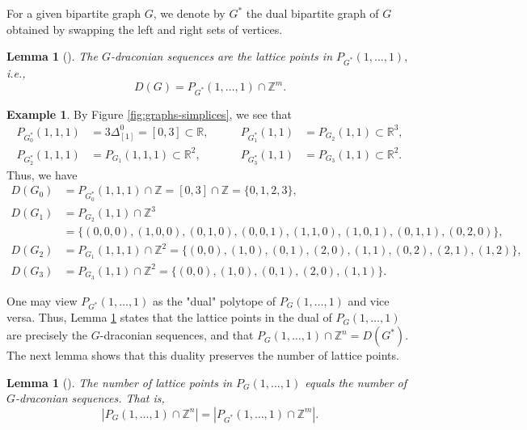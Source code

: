 \documentclass[11pt,a4paper]{article}
\newcommand{\R}{\mathbb{R}}
\newcommand{\Z}{\mathbb{Z}}
\newcommand{\1}{\mathbf{1}}
\theoremstyle{plain}
\newtheorem{lemma}[theorem]{Lemma}
\theoremstyle{definition}
\newtheorem{example}[theorem]{Example}
\begin{document}
For a given bipartite graph $G$, we denote by $G^*$ the dual bipartite graph of $G$ obtained by swapping the left and right sets of vertices.

\begin{lemma}[\cite{Postnikov2009}]\label{lem: draconion-sequences-dual}
The $G$-draconian sequences are the lattice points in $P_{G^*}(1,\ldots,1),$ i.e., 
\[D(G) = P_{G^*}(1,\ldots,1)\cap \Z^m.\]    
\end{lemma}

\begin{example}\label{ex:draconian-sequences}
    By Figure \ref{fig:graphs-simplices}, we see that
    \begin{align*}
    P_{G^*_0}(1,1,1) &= 3\Delta^0_{[1]} = [0,3] \subset \R,
    &\qquad P_{G_1^*}(1,1) &= P_{G_2}(1,1) \subset \R^3,\\
    P_{G_2^*}(1,1,1) &= P_{G_1}(1,1,1) \subset \R^2,
    &\qquad P_{G_3^*}(1,1) &= P_{G_3}(1,1) \subset \R^2.
\end{align*}
Thus, we have
    \begin{align*}
        D(G_0) &= P_{G^*_0}(1,1,1)\cap \Z = [0,3]\cap \Z= \{0,1,2,3\},\\
        D(G_1) &= P_{G_2}(1,1)\cap \Z^3 \\
        &= \{(0,0,0), (1,0,0), (0,1,0),(0,0,1),(1,1,0),(1,0,1),(0,1,1),(0,2,0)\},\\
        D(G_2) &= P_{G_1}(1,1,1)\cap \Z^2 = \{(0,0), (1,0),(0,1),(2,0),(1,1),(0,2),(2,1),(1,2)\},\\
        D(G_3) &= P_{G_3}(1,1)\cap \Z^2 = \{(0,0), (1,0),(0,1),(2,0),(1,1)\}.
    \end{align*}
\end{example}

One may view $P_{G^*}(1,\ldots,1)$ as the "dual" polytope of $P_G(1,\ldots,1)$ and vice versa. Thus, Lemma \ref{lem: draconion-sequences-dual} states that the lattice points in the dual of $P_{G}(1,\ldots,1)$ are precisely the $G$-draconian sequences, and that $P_G(1,\dots, 1)\cap \Z^n = D(G^*)$.  The next lemma shows that this duality preserves the number of lattice points.

\begin{lemma}[\cite{Postnikov2009}]\label{lem: lattice-points-draconion-sequences}
The number of lattice points in $P_G(1,\ldots,1)$ equals the number of $G$-draconian sequences. That is,
\[
|P_G(1,\ldots,1)\cap\Z^n|=|P_{G^*}(1,\ldots,1)\cap\Z^m|.
\]
\end{lemma}
\end{document}
